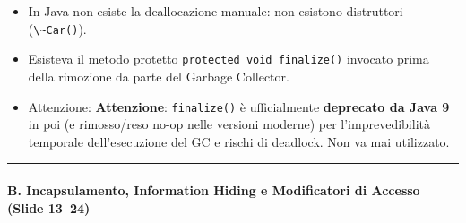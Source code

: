 \documentclass[11pt,a4paper]{article}
\newcommand{\passthrough}[1]{#1}
\providecommand{\tightlist}{\setlength{\itemsep}{0pt}\setlength{\parskip}{0pt}}
\begin{document}
\begin{itemize}
  \begin{itemize}
  \tightlist
  \item
    In Java non esiste la deallocazione manuale: non esistono
    distruttori (\passthrough{\lstinline!\~Car()!}).
  \item
    Esisteva il metodo protetto
    \passthrough{\lstinline!protected void finalize()!} invocato prima
    della rimozione da parte del Garbage Collector.
  \item
    Attenzione: \textbf{Attenzione}:
    \passthrough{\lstinline!finalize()!} è ufficialmente
    \textbf{deprecato da Java 9} in poi (e rimosso/reso no-op nelle
    versioni moderne) per l'imprevedibilità temporale dell'esecuzione
    del GC e rischi di deadlock. Non va mai utilizzato.
  \end{itemize}
\end{itemize}

\begin{center}\rule{0.5\linewidth}{0.5pt}\end{center}

\paragraph{B. Incapsulamento, Information Hiding e Modificatori di
Accesso (Slide
13--24)}\label{b.-incapsulamento-information-hiding-e-modificatori-di-accesso-slide-1324}
\end{document}
